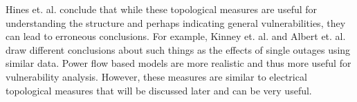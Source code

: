 Hines et. al. \cite{hines_2010} conclude that while these topological measures are useful for understanding the structure and perhaps indicating general vulnerabilities, they can lead to erroneous conclusions.  For example, Kinney et. al. \cite{kinney_2005} and Albert et. al. \cite{albert_2004} draw different conclusions about such things as the effects of single outages using similar data.  Power flow based models are more realistic and thus more useful for vulnerability analysis.  However, these measures are similar to electrical topological measures that will be discussed later and can be very useful.

